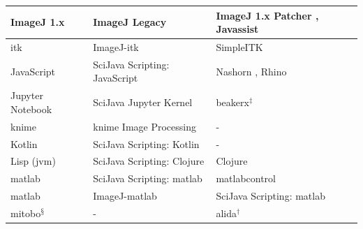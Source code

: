 \documentclass{bmcart}
\begin{document}
\begin{table}[h!]
\begin{tabular}{| l | l | l |}
      ImageJ 1.x                                  \cite{imagej_history}  & ImageJ Legacy                         \cite{imagej_legacy}           & ImageJ 1.x Patcher \cite{ij1_patcher}, Javassist    \cite{javassist}       \\ \hline
      \acrshort{itk}                              \cite{itk}             & ImageJ-\acrshort{itk}                 \cite{imagej_itk}              & SimpleITK                                           \cite{simpleitk}       \\ \hline
      JavaScript                                  \cite{javascript}      & SciJava Scripting: JavaScript         \cite{scripting_javascript}    & Nashorn \cite{nashorn}, Rhino                       \cite{rhino}           \\ \hline
      Jupyter Notebook                            \cite{jupyter}         & SciJava Jupyter Kernel                \cite{scijava_jupyter_kernel}  & \acrshort{beakerx}$^\ddagger$                       \cite{beakerx}         \\ \hline
      \acrshort{knime}                            \cite{knime}           & \acrshort{knime} Image Processing     \cite{knip}                    & -                                                                          \\ \hline
      Kotlin                                      \cite{kotlin}          & SciJava Scripting: Kotlin             \cite{scripting_kotlin}        & -                                                                          \\ \hline
      Lisp (\acrshort{jvm})                       \cite{lisp}            & SciJava Scripting: Clojure            \cite{scripting_clojure}       & Clojure                                             \cite{clojure}         \\ \hline
      \acrshort{matlab}                           \cite{matlab}          & SciJava Scripting: \acrshort{matlab}  \cite{scripting_matlab}        & matlabcontrol                                       \cite{matlabcontrol}   \\ \hline
      \acrshort{matlab}                                                  & ImageJ-\acrshort{matlab}              \cite{imagej_matlab}           & SciJava Scripting: \acrshort{matlab}                                       \\ \hline
      \acrshort{mitobo}$^\mathsection$            \cite{mitobo}          & -                                                                    & \acrshort{alida}$^\dagger$                          \cite{alida}           \\ \hline

\end{tabular}
\end{table}
\end{document}
